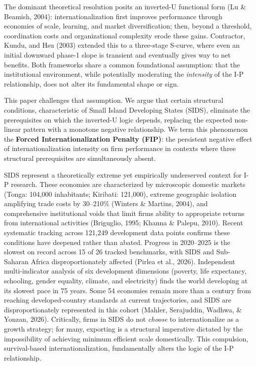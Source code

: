 \documentclass[12pt,a4paper]{article}
\begin{document}
The dominant theoretical resolution posits an inverted-U functional form
(Lu \& Beamish, 2004): internationalization first improves performance
through economies of scale, learning, and market diversification; then,
beyond a threshold, coordination costs and organizational complexity
erode these gains. Contractor, Kundu, and Hsu (2003) extended this to a
three-stage S-curve, where even an initial downward phase-1 slope is
transient and eventually gives way to net benefits. Both frameworks
share a common foundational assumption: that the institutional
environment, while potentially moderating the \emph{intensity} of the
I-P relationship, does not alter its fundamental shape or sign.

This paper challenges that assumption. We argue that certain structural
conditions, characteristic of Small Island Developing States (SIDS),
eliminate the prerequisites on which the inverted-U logic depends,
replacing the expected non-linear pattern with a monotone negative
relationship. We term this phenomenon the \textbf{Forced
Internationalization Penalty (FIP)}: the persistent negative effect of
internationalization intensity on firm performance in contexts where
three structural prerequisites are simultaneously absent.

SIDS represent a theoretically extreme yet empirically underserved
context for I-P research. These economies are characterized by
microscopic domestic markets (Tonga: 104,000 inhabitants; Kiribati:
121,000), extreme geographic isolation amplifying trade costs by
30--210\% (Winters \& Martins, 2004), and comprehensive institutional
voids that limit firms\textquotesingle{} ability to appropriate returns
from international activities (Briguglio, 1995; Khanna \& Palepu, 2010).
Recent systematic tracking across 121,249 development data points
confirms these conditions have deepened rather than abated. Progress in
2020--2025 is the slowest on record across 15 of 26 tracked benchmarks,
with SIDS and Sub-Saharan Africa disproportionately affected (Pirlea et
al., 2026). Independent multi-indicator analysis of six development
dimensions (poverty, life expectancy, schooling, gender equality,
climate, and electricity) finds the world developing at its slowest pace
in 75 years. Some 54 economies remain more than a century from reaching
developed-country standards at current trajectories, and SIDS are
disproportionately represented in this cohort (Mahler, Serajuddin,
Wadhwa, \& Yonzan, 2026). Critically, firms in SIDS do not \emph{choose}
to internationalize as a growth strategy; for many, exporting is a
structural imperative dictated by the impossibility of achieving minimum
efficient scale domestically. This compulsion, survival-based
internationalization, fundamentally alters the logic of the I-P
relationship.
\end{document}
